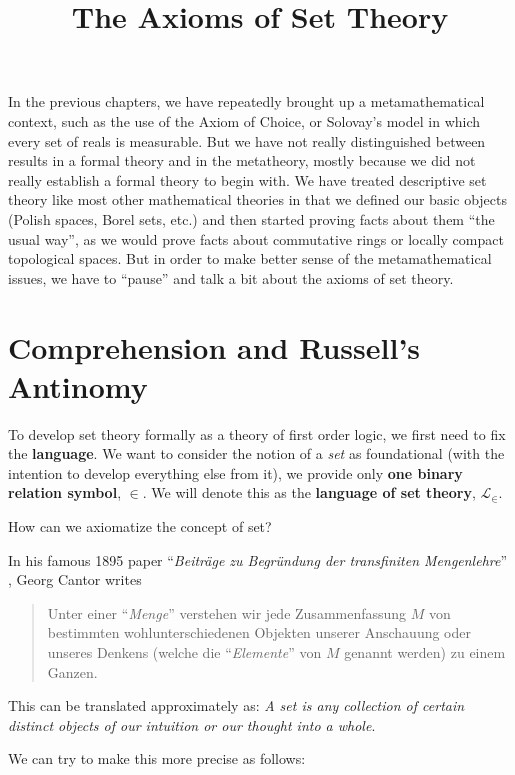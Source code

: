\documentclass{article}
\title{The Axioms of Set Theory}
\date{\displaydate{articleDate}}
\author{}
\begin{document}
\maketitle

In the previous chapters, we have repeatedly brought up a metamathematical context, such as the use of the Axiom of Choice, or Solovay's model in which every set of reals is measurable. But we have not really distinguished between results in a formal theory and in the metatheory, mostly because we did not really establish a formal theory to begin with. We have treated descriptive set theory like most other mathematical theories in that we defined our basic objects (Polish spaces, Borel sets, etc.) and then started proving facts about them ``the usual way'', as we would prove facts about commutative rings or locally compact topological spaces. But in order to make better sense of the metamathematical issues, we have to ``pause'' and talk a bit about the axioms of set theory.

\section{Comprehension and Russell's Antinomy}

To develop set theory formally as a theory of first order logic, we first need to fix the \textbf{language}. We want to consider the notion of a \textit{set} as foundational (with the intention to develop everything else from it), we provide only \textbf{one binary relation symbol}, $\in$. We will denote this as the \textbf{language of set theory}, $\mathcal{L}_\in$.

How can we axiomatize the concept of set?

In his famous 1895 paper ``\textit{Beiträge zu Begründung der transfiniten Mengenlehre}'' \cite{Cantor_1895s}, Georg Cantor writes

\begin{quote}
Unter einer ``\textit{Menge}'' verstehen wir jede Zusammenfassung $M$ von bestimmten wohlunterschiedenen Objekten unserer Anschauung oder unseres Denkens (welche die ``\textit{Elemente}'' von  $M$  genannt werden)  zu einem Ganzen.
\end{quote}

This can be translated approximately as: \textit{A set is any collection of certain distinct objects of our intuition or our thought into a whole}.

We can try to make this more precise as follows:
\end{document}
